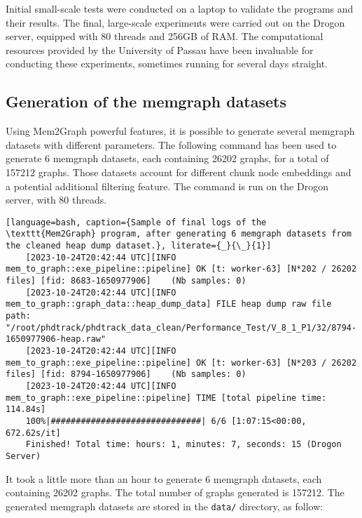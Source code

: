 Initial small-scale tests were conducted on a laptop to validate the programs and their results. The final, large-scale experiments were carried out on the Drogon server, equipped with 80 threads and 256GB of RAM. The computational resources provided by the University of Passau have been invaluable for conducting these experiments, sometimes running for several days straight.

\subsection{Generation of the memgraph datasets}
Using Mem2Graph powerful features, it is possible to generate several memgraph datasets with different parameters. The following command has been used to generate 6 memgraph datasets, each containing 26202 graphs, for a total of 157212 graphs. Those datasets account for different chunk node embeddings and a potential additional filtering feature. The command is run on the Drogon server, with 80 threads.

\begin{lstlisting}[language=bash, caption={Sample of final logs of the \texttt{Mem2Graph} program, after generating 6 memgraph datasets from the cleaned heap dump dataset.}, literate={_}{\_}{1}]
    [2023-10-24T20:42:44 UTC][INFO mem_to_graph::exe_pipeline::pipeline] OK [t: worker-63] [N*202 / 26202 files] [fid: 8683-1650977906]    (Nb samples: 0)
    [2023-10-24T20:42:44 UTC][INFO mem_to_graph::graph_data::heap_dump_data] FILE heap dump raw file path: "/root/phdtrack/phdtrack_data_clean/Performance_Test/V_8_1_P1/32/8794-1650977906-heap.raw"
    [2023-10-24T20:42:44 UTC][INFO mem_to_graph::exe_pipeline::pipeline] OK [t: worker-63] [N*203 / 26202 files] [fid: 8794-1650977906]    (Nb samples: 0)
    [2023-10-24T20:42:44 UTC][INFO mem_to_graph::exe_pipeline::pipeline] TIME [total pipeline time: 114.84s]
    100%|##############################| 6/6 [1:07:15<00:00, 672.62s/it]
    Finished! Total time: hours: 1, minutes: 7, seconds: 15 (Drogon Server)
\end{lstlisting}

It took a little more than an hour to generate 6 memgraph datasets, each containing 26202 graphs. The total number of graphs generated is 157212. The generated memgraph datasets are stored in the \texttt{data/} directory, as follow:

